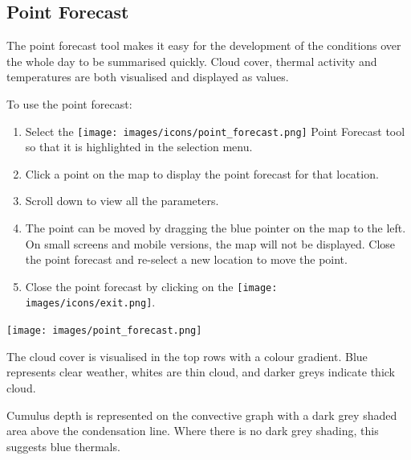 \documentclass[11pt,a4paper]{article}
\begin{document}
\subsection{Point Forecast}
The point forecast tool makes it easy for the development of the conditions over the whole day to be summarised quickly. Cloud cover, thermal activity and temperatures are both visualised and displayed as values.


To use the point forecast:
\begin{enumerate}
\item Select the \texttt{[image: images/icons/point\_forecast.png]} Point Forecast tool so that it is highlighted in the selection menu.
\item Click a point on the map to display the point forecast for that location.
\item Scroll down to view all the parameters.
\item The point can be moved by dragging the blue pointer on the map to the left. On small screens and mobile versions, the map will not be displayed. Close the point forecast and re-select a new location to move the point.
\item Close the point forecast by clicking on the \texttt{[image: images/icons/exit.png]}.
\end{enumerate}
\begin{center}
\texttt{[image: images/point\_forecast.png]}
\end{center}
The cloud cover is visualised in the top rows with a colour gradient. Blue represents clear weather, whites are thin cloud, and darker greys indicate thick cloud.

Cumulus depth is represented on the convective graph with a dark grey shaded area above the condensation line. Where there is no dark grey shading, this suggests blue thermals.
\end{document}
